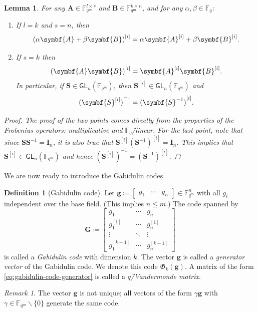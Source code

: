 \documentclass[version=last, paper=A4, parskip=half, oneside]{scrbook}
\theoremstyle{plain}
\newtheorem{lemma}{Lemma}
\theoremstyle{definition}
\newtheorem{definition}{Definition}
\theoremstyle{remark}
\newtheorem*{remark}{Remark}
\renewcommand*{\vec}{\symbf}
\newcommand*{\mat}{\symbf}
\newcommand*{\GL}{\ensuremath{\mathsf{GL}}}
\newcommand*{\FF}{\ensuremath{\mathbb{F}}}
\newcommand*{\Gab}{\ensuremath{\mathfrak{G}}}
\begin{document}
\begin{lemma}\label{lem:frobenius-automorphism-properties}
  For any \(\mat{A} \in \FF_{q^m}^{l \times s}\) and
  \(\mat{B} \in \FF_{q^m}^{k \times n}\), and for any
  \(\alpha, \beta \in \FF_q\):
  \begin{enumerate}
  \item If \(l = k\) and \(s = n\), then
    \[
      {(\alpha \mat{A} + \beta \mat{B})}^{[i]} = \alpha \mat{A}^{[i]} + \beta \mat{B}^{[i]}\text.
    \]
  \item If \(s = k\) then
    \[
      {(\mat{A} \mat{B})}^{[i]} = \mat{A}^{[i]} \mat{B}^{[i]}\text.
    \]
    In particular, if \(\mat{S} \in \GL_n(\FF_{q^m})\), then
    \(\mat{S}^{[i]} \in \GL_n(\FF_{q^m})\) and
    \[
      {(\mat{S}^{[i]})}^{-1} = {(\mat{S}^{-1})}^{[i]}\text.
    \]
  \end{enumerate}
  \begin{proof}
    The proof of the two points comes directly from the properties of the
    Frobenius operators: multiplicative and \(\FF_q\)\=/linear.  For the last
    point, note that since \(\mat{S} \mat{S}^{-1} = \mat{I}_n\), it is also true
    that \(\mat{S}^{[i]} {(\mat{S}^{-1})}^{[i]} = \mat{I}_n\).  This implies
    that \(\mat{S}^{[i]} \in \GL_n(\FF_{q^m})\) and hence
    \({(\mat{S}^{[i]})}^{-1} = {(\mat{S}^{-1})}^{[i]}\).
  \end{proof}
\end{lemma}

We are now ready to introduce the Gabidulin codes.

\begin{definition}[Gabidulin code]
  Let
  \(\vec{g} \coloneqq \begin{bmatrix} g_1 & \cdots & g_n \end{bmatrix} \in \FF_{q^m}^n\)
  with all \(g_i\) independent over the base field.  (This implies \(n \le m\).)
  The code spanned by
  \begin{equation}\label{eq:gabidulin-code-generator}
    \mat{G} \coloneqq
    \begin{bmatrix}
      g_1 & \cdots & g_n \\
      g_1^{[1]} & \cdots & g_n^{[1]} \\
      \vdots & \ddots & \vdots \\
      g_1^{[k - 1]} & \cdots & g_n^{[k - 1]}
    \end{bmatrix}
  \end{equation}
  is called a \emph{Gabidulin code} with dimension \(k\).  The vector
  \(\vec{g}\) is called a \emph{generator vector} of the Gabidulin code.  We
  denote this code \(\Gab_k(\vec{g})\).  A matrix of the form
  \cref{eq:gabidulin-code-generator} is called a \emph{\(q\)\=/Vandermonde
    matrix}.
  \begin{remark}
    The vector \(\vec{g}\) is not unique; all vectors of the form
    \(\gamma \vec{g}\) with \(\gamma \in \FF_{q^m} \smallsetminus \{0\}\)
    generate the same code.
  \end{remark}
\end{definition}
\end{document}
